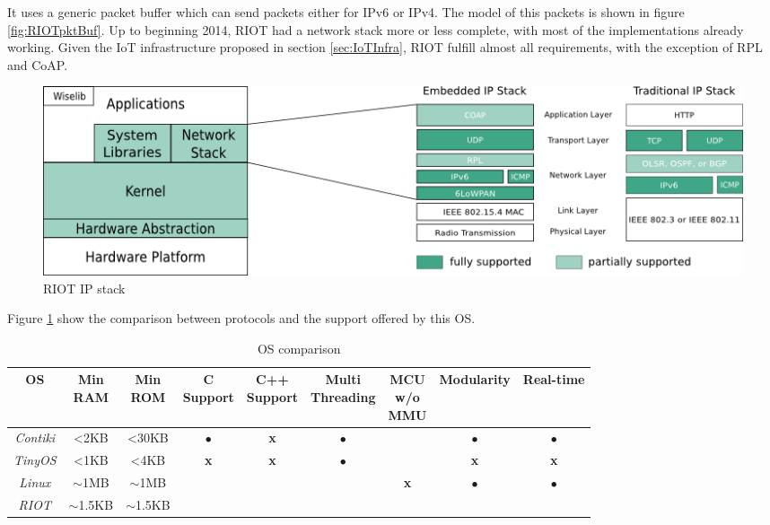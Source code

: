 It uses a generic packet buffer which can send packets either for IPv6 or IPv4.
The model of this packets is shown in figure \ref{fig:RIOTpktBuf}.
Up to beginning 2014, RIOT had a network stack more or less complete, with most of the implementations already working.
Given the IoT infrastructure proposed in section \ref{sec:IoTInfra}, RIOT fulfill almost all requirements, with the exception of RPL and CoAP.

\begin{figure}[htb]
	\centering
	\includegraphics[width=1\columnwidth]{chapters/background.images/RIOTIPStack.png}
	\caption{RIOT IP stack}
	\label{fig:RIOTIPStack}
\end{figure}

Figure \ref{fig:RIOTIPStack} show the comparison between protocols and the support offered by this OS. 

\begin{table}[htb]
	\scriptsize
	\centering
	\caption{OS comparison}
	\label{tab:OSComparison}
	\begin{tabular}{|c|cccccccc}
		\hline
		\textbf{OS} & 
		\multicolumn{1}{p{0.8cm}|}{\textbf{Min} \newline \textbf{RAM}} &
		\multicolumn{1}{p{0.8cm}|}{\textbf{Min} \newline \textbf{ROM}} &
		\multicolumn{1}{p{1.3cm}|}{\textbf{C} \newline \textbf{Support}} &
		\multicolumn{1}{p{1.3cm}|}{\textbf{C++} \newline \textbf{Support}} &
		\multicolumn{1}{p{1.6cm}|}{\textbf{Multi} \newline \textbf{Threading}} &
		\multicolumn{1}{p{1cm}|}{\textbf{MCU} \newline \textbf{w/o} \newline \textbf{MMU}} &
		\multicolumn{1}{c|}{\textbf{Modularity}} &
		\multicolumn{1}{c|}{\textbf{Real-time}} \\ \hline
		\textit{Contiki} & \textless 2KB & \textless 30KB &$\bullet$ & \textbf{x}       & $\bullet$     & \checkmark     &$\bullet$ &    $\bullet$ \\ \cline{1-1}
		\textit{TinyOS}  & \textless 1KB & \textless 4KB  &\textbf{x}& \textbf{x}       & $\bullet$     & \checkmark     &\textbf{x}&   \textbf{x}\\ \cline{1-1}
		\textit{Linux}   & $\mathtt{\sim}$1MB &$\mathtt{\sim}$1MB&\checkmark & \checkmark       &  \checkmark   & \textbf{x} &$\bullet$   &$\bullet$    \\ \cline{1-1}
		\textit{RIOT} & $\mathtt{\sim}$1.5KB & $\mathtt{\sim}$1.5KB & \checkmark    & \checkmark       & \checkmark & \checkmark & \checkmark & \checkmark  \\ \cline{1-1}
	\end{tabular}
\end{table}

